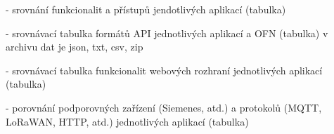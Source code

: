 - srovnání funkcionalit a přístupů jendotlivých aplikací (tabulka)

- srovnávací tabulka formátů API jednotlivých aplikací a OFN (tabulka)
  v archivu dat je json, txt, csv, zip 

- srovnávací tabulka funkcionalit webových rozhraní jednotlivých aplikací (tabulka)

- porovnání podporovných zařízení (Siemenes, atd.) a protokolů (MQTT, LoRaWAN, HTTP, atd.) jednotlivých aplikací (tabulka)

